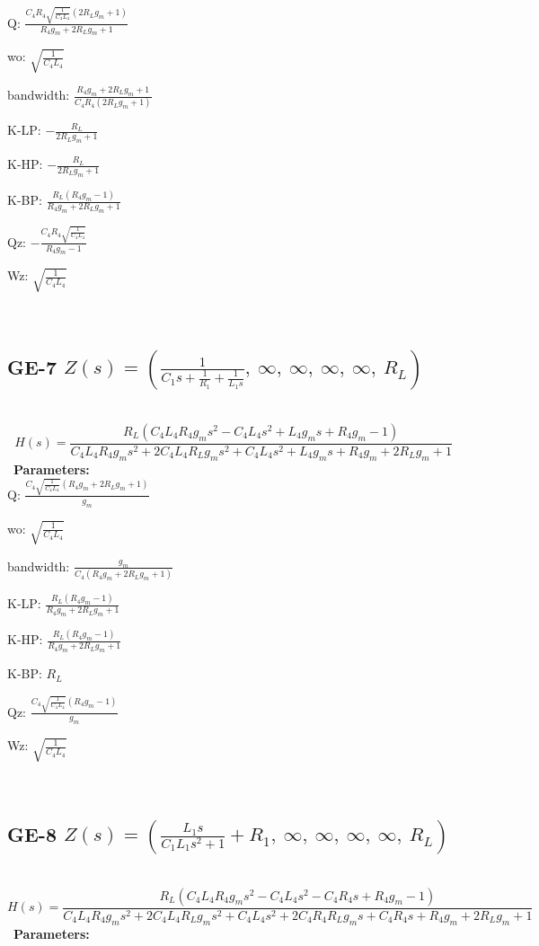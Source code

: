 \documentclass{article}
\begin{document}
Q: $\frac{C_{4} R_{4} \sqrt{\frac{1}{C_{4} L_{4}}} \left(2 R_{L} g_{m} + 1\right)}{R_{4} g_{m} + 2 R_{L} g_{m} + 1}$\ 

wo: $\sqrt{\frac{1}{C_{4} L_{4}}}$\ 

bandwidth: $\frac{R_{4} g_{m} + 2 R_{L} g_{m} + 1}{C_{4} R_{4} \left(2 R_{L} g_{m} + 1\right)}$\ 

K-LP: $- \frac{R_{L}}{2 R_{L} g_{m} + 1}$\ 

K-HP: $- \frac{R_{L}}{2 R_{L} g_{m} + 1}$\ 

K-BP: $\frac{R_{L} \left(R_{4} g_{m} - 1\right)}{R_{4} g_{m} + 2 R_{L} g_{m} + 1}$\ 

Qz: $- \frac{C_{4} R_{4} \sqrt{\frac{1}{C_{4} L_{4}}}}{R_{4} g_{m} - 1}$\ 

Wz: $\sqrt{\frac{1}{C_{4} L_{4}}}$\ 

\ 

\subsection{GE-7 $Z(s) = \left( \frac{1}{C_{1} s + \frac{1}{R_{1}} + \frac{1}{L_{1} s}}, \  \infty, \  \infty, \  \infty, \  \infty, \  R_{L}\right)$ } \ 
\textbf{\[H(s) = \frac{R_{L} \left(C_{4} L_{4} R_{4} g_{m} s^{2} - C_{4} L_{4} s^{2} + L_{4} g_{m} s + R_{4} g_{m} - 1\right)}{C_{4} L_{4} R_{4} g_{m} s^{2} + 2 C_{4} L_{4} R_{L} g_{m} s^{2} + C_{4} L_{4} s^{2} + L_{4} g_{m} s + R_{4} g_{m} + 2 R_{L} g_{m} + 1}\] } \ 
\textbf{Parameters:}\\ 

Q: $\frac{C_{4} \sqrt{\frac{1}{C_{4} L_{4}}} \left(R_{4} g_{m} + 2 R_{L} g_{m} + 1\right)}{g_{m}}$\ 

wo: $\sqrt{\frac{1}{C_{4} L_{4}}}$\ 

bandwidth: $\frac{g_{m}}{C_{4} \left(R_{4} g_{m} + 2 R_{L} g_{m} + 1\right)}$\ 

K-LP: $\frac{R_{L} \left(R_{4} g_{m} - 1\right)}{R_{4} g_{m} + 2 R_{L} g_{m} + 1}$\ 

K-HP: $\frac{R_{L} \left(R_{4} g_{m} - 1\right)}{R_{4} g_{m} + 2 R_{L} g_{m} + 1}$\ 

K-BP: $R_{L}$\ 

Qz: $\frac{C_{4} \sqrt{\frac{1}{C_{4} L_{4}}} \left(R_{4} g_{m} - 1\right)}{g_{m}}$\ 

Wz: $\sqrt{\frac{1}{C_{4} L_{4}}}$\ 

\ 

\subsection{GE-8 $Z(s) = \left( \frac{L_{1} s}{C_{1} L_{1} s^{2} + 1} + R_{1}, \  \infty, \  \infty, \  \infty, \  \infty, \  R_{L}\right)$ } \ 
\textbf{\[H(s) = \frac{R_{L} \left(C_{4} L_{4} R_{4} g_{m} s^{2} - C_{4} L_{4} s^{2} - C_{4} R_{4} s + R_{4} g_{m} - 1\right)}{C_{4} L_{4} R_{4} g_{m} s^{2} + 2 C_{4} L_{4} R_{L} g_{m} s^{2} + C_{4} L_{4} s^{2} + 2 C_{4} R_{4} R_{L} g_{m} s + C_{4} R_{4} s + R_{4} g_{m} + 2 R_{L} g_{m} + 1}\] } \ 
\textbf{Parameters:}\\ 
\end{document}
